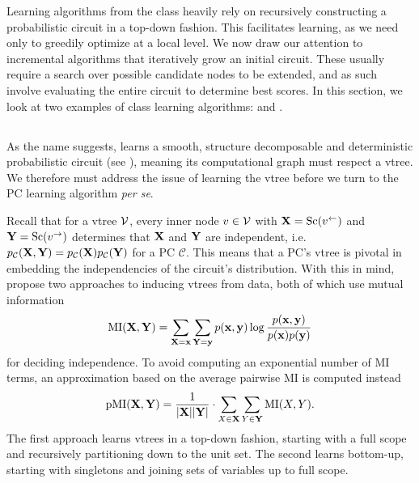 Learning algorithms from the \divclass{} class heavily rely on recursively constructing a
probabilistic circuit in a top-down fashion. This facilitates learning, as we need only to greedily
optimize at a local level. We now draw our attention to incremental algorithms that iteratively
grow an initial circuit. These usually require a search over possible candidate nodes to be
extended, and as such involve evaluating the entire circuit to determine best scores. In this
section, we look at two examples of \incrclass{} class learning algorithms: 
and .

\subsection{}

As the name suggests,  \citep{liang17} learns a smooth, structure decomposable
and deterministic probabilistic circuit (see ), meaning its
computational graph must respect a vtree. We therefore must address the issue of learning the vtree
before we turn to the PC learning algorithm \emph{per se}.

Recall that for a vtree $\operatorname{\mathcal{V}}$, every inner node $v\in\operatorname{\mathcal{V}}$ with $\mathbf{X}=\operatorname*{\normalfont{Sc}}(v^\gets)$ and
$\mathbf{Y}=\operatorname*{\normalfont{Sc}}(v^\to)$ determines that $\mathbf{X}$ and $\mathbf{Y}$ are independent, i.e.\
$p_\mathcal{C}(\mathbf{X},\mathbf{Y})=p_\mathcal{C}(\mathbf{X}) p_\mathcal{C}(\mathbf{Y})$ for a PC
$\mathcal{C}$. This means that a PC's vtree is pivotal in embedding the independencies of the
circuit's distribution. With this in mind, \citet{liang17} propose two approaches to inducing
vtrees from data, both of which use mutual information
\begin{equation*}
  \operatorname{\normalfont{MI}}(\mathbf{X},\mathbf{Y})=\sum_{\mathbf{X}=\mathbf{x}}\sum_{\mathbf{Y}=\mathbf{y}}p(\mathbf{x},\mathbf{y})\log\frac{p(\mathbf{x},\mathbf{y})}{p(\mathbf{x})p(\mathbf{y})}
\end{equation*}
for deciding independence. To avoid computing an exponential number of MI terms, an approximation
based on the average pairwise MI is computed instead
\begin{equation*}
  \operatorname{\normalfont{pMI}}(\mathbf{X},\mathbf{Y})=\frac{1}{|\mathbf{X}||\mathbf{Y}|}\cdot\sum_{X\in\mathbf{X}}\sum_{Y\in\mathbf{Y}}\operatorname{\normalfont{MI}}(X,Y).
\end{equation*}
The first approach learns vtrees in a top-down fashion, starting with a full scope and recursively
partitioning down to the unit set. The second learns bottom-up, starting with singletons and
joining sets of variables up to full scope.

